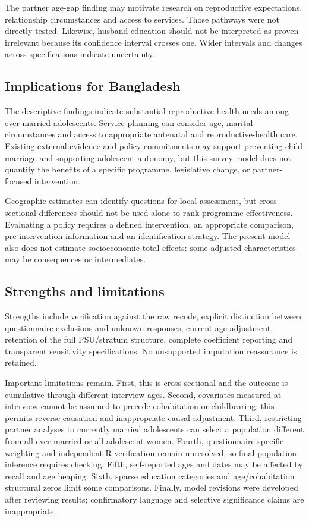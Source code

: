 \documentclass[11pt]{article}
\begin{document}
The partner age-gap finding may motivate research on reproductive expectations, relationship circumstances and access to services. Those pathways were not directly tested. Likewise, husband education should not be interpreted as proven irrelevant because its confidence interval crosses one. Wider intervals and changes across specifications indicate uncertainty.

\subsection{Implications for Bangladesh}
The descriptive findings indicate substantial reproductive-health needs among ever-married adolescents. Service planning can consider age, marital circumstances and access to appropriate antenatal and reproductive-health care. Existing external evidence and policy commitments may support preventing child marriage and supporting adolescent autonomy,\cite{who} but this survey model does not quantify the benefits of a specific programme, legislative change, or partner-focused intervention.

Geographic estimates can identify questions for local assessment, but cross-sectional differences should not be used alone to rank programme effectiveness. Evaluating a policy requires a defined intervention, an appropriate comparison, pre-intervention information and an identification strategy. The present model also does not estimate socioeconomic total effects: some adjusted characteristics may be consequences or intermediates.

\subsection{Strengths and limitations}
Strengths include verification against the raw recode, explicit distinction between questionnaire exclusions and unknown responses, current-age adjustment, retention of the full PSU/stratum structure, complete coefficient reporting and transparent sensitivity specifications. No unsupported imputation reassurance is retained.

Important limitations remain. First, this is cross-sectional and the outcome is cumulative through different interview ages. Second, covariates measured at interview cannot be assumed to precede cohabitation or childbearing; this permits reverse causation and inappropriate causal adjustment. Third, restricting partner analyses to currently married adolescents can select a population different from all ever-married or all adolescent women. Fourth, questionnaire-specific weighting and independent R verification remain unresolved, so final population inference requires checking. Fifth, self-reported ages and dates may be affected by recall and age heaping. Sixth, sparse education categories and age/cohabitation structural zeros limit some comparisons. Finally, model revisions were developed after reviewing results; confirmatory language and selective significance claims are inappropriate.
\end{document}
